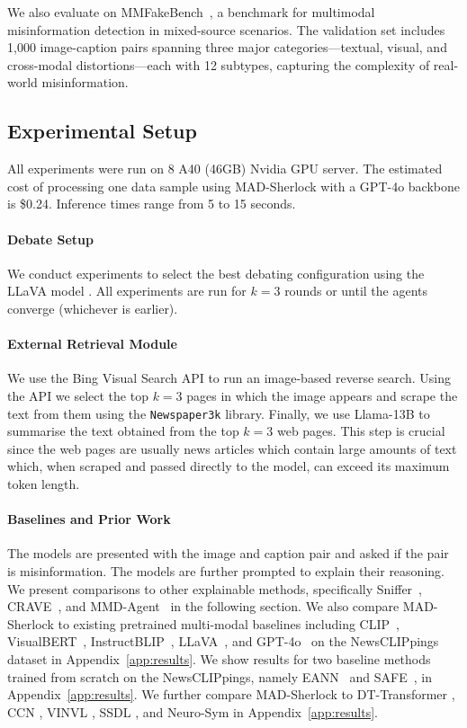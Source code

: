 \documentclass{article}
\theoremstyle{plain}
\theoremstyle{definition}
\theoremstyle{remark}
\newcommand{\frameworkname}{MAD-Sherlock}
\begin{document}
We also evaluate on MMFakeBench~\citep{mmfakebench}, a benchmark for multimodal misinformation detection in mixed-source scenarios. The validation set includes 1,000 image-caption pairs spanning three major categories—textual, visual, and cross-modal distortions—each with 12 subtypes, capturing the complexity of real-world misinformation.


\subsection{Experimental Setup}
All experiments were run on 8 A40 (46GB) Nvidia GPU server. The estimated cost of processing one data sample using \frameworkname{} with a GPT-4o backbone is \$0.24. Inference times range from 5 to 15 seconds.
%
\paragraph{Debate Setup} We conduct experiments to select the best debating configuration using the LLaVA model \citep{liu2024llavanext}. All experiments are run for $k=3$ rounds or until the agents converge (whichever is earlier).
%
\paragraph{External Retrieval Module} We use the Bing Visual Search API to run an image-based reverse search. Using the API we select the top $k=3$ pages in which the image appears and scrape the text from them using the \texttt{Newspaper3k} library. Finally, we use Llama-13B \citep{llama} to summarise the text obtained from the top $k=3$ web pages. This step is crucial since the web pages are usually news articles which contain large amounts of text which, when scraped and passed directly to the model, can exceed its maximum token length.
%
\paragraph{Baselines and Prior Work}\label{baselines} The models are presented with the image and caption pair and asked if the pair is misinformation. The models are further prompted to explain their reasoning. We present comparisons to other explainable methods, specifically Sniffer~\citep{qi2024sniffermultimodallargelanguage}, CRAVE~\citep{crave}, and MMD-Agent~\cite{mmfakebench} in the following section. We also compare \frameworkname{} to existing pretrained multi-modal baselines including CLIP~\citep{radford2021learning}, VisualBERT~\citep{li2019visualbert}, InstructBLIP~\citep{dai2023instructblipgeneralpurposevisionlanguagemodels}, LLaVA~\citep{liu2024llavanext}, and GPT-4o~\citep{openai2024gpt4technicalreport, gpt4o} on the NewsCLIPpings dataset in Appendix~\ref{app:results}. We show results for two baseline methods trained from scratch on the NewsCLIPpings, namely EANN~\citep{eann} and SAFE~\citep{zhou2020safesimilarityawaremultimodalfake}, in Appendix~\ref{app:results}. We further compare \frameworkname{} to DT-Transformer \citep{papdopoulos}, CCN \citep{abdelnabi2022opendomaincontentbasedmultimodalfactchecking}, VINVL \citep{huang2024exposing}, SSDL \citep{Mu_2023_WACV}, and Neuro-Sym \citep{zhu2022generalizationdifferencesendtoendneurosymbolic} in Appendix~\ref{app:results}. 
\end{document}
